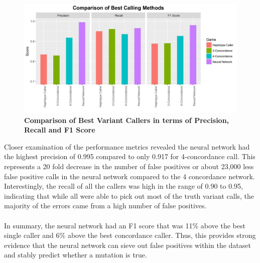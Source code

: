 \documentclass{article}
\begin{document}
\begin{figure}[H]
\includegraphics[width=\textwidth]{masonheadsupcomparison.jpg}
\caption{\textbf{Comparison of Best Variant Callers in terms of Precision, Recall and F1 Score}}
\centering
\end{figure}
Closer examination of the performance metrics revealed the neural network had the highest precision of 0.995 compared to only 0.917 for 4-concordance call. This represents a 20 fold decrease in the number of false positives or about 23,000 less false positive calls in the neural network compared to the 4 concordance network. Interestingly, the recall of all the callers was high in the range of 0.90 to 0.95, indicating that while all were able to pick out most of the truth variant calls, the majority of the errors came from a high number of false positives.\\\\ 
In summary, the neural network had an F1 score that was 11\% above the best single caller and 6\% above the best concordance caller. Thus, this provides strong evidence that the neural network can sieve out false positives within the dataset and stably predict whether a mutation is true.
\end{document}
